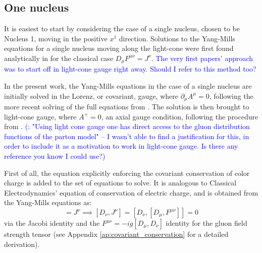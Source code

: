 \subsection{One nucleus}
It is easiest to start by considering the case of a single nucleus, chosen to be Nucleus 1, moving in the positive $x^1$ direction.
Solutions to the Yang-Mills equations for a single nucleus moving along the light-cone were first found analytically in \cite{McLerran:1993ka} for the classical case $D_{\mu}F^{\mu \nu} = J^\nu$.   \textcolor{blue}{The very first papers' approach was to start off in light-cone gauge right away. Should I refer to this method too?}

In the present work, the Yang-Mills equations in the case of a single nucleus are initially solved in the Lorenz, or covariant, gauge, where $\partial_\mu A^\mu=0$, following the more recent solving of the full equations from \cite[Section 2.2]{Blaizot:2004wu}. The solution is then brought to light-cone gauge, where $A^+=0$, an axial gauge condition, following the procedure from \cite[Section 3A]{Carrington:2022bnv}. \textcolor{blue}{(\cite{Kovner:1995ja}: "Using light cone gauge one has direct access to the gluon distribution functions of the parton model" -- I wasn't able to find a justification for this, in order to include it as a motivation to work in light-cone gauge. Is there any reference you know I could use?)} %

First of all, the equation explicitly enforcing the covariant conservation of color charge is added to the set of equations to solve. It is analogous to Classical Electrodynamics' equation of conservation of electric charge, and is obtained from the Yang-Mills equations as:
\begin{equation}
	[D_\mu, F^{\mu \nu}] = J^\nu \implies [D_\nu, J^\nu] = [D_\nu, [D_\mu, F^{\mu \nu}]] = 0
	\label{eq:covariant_conservation}
\end{equation}
via the Jacobi identity and the $F^{\mu \nu} = -ig [D_\mu, D_\nu]$ identity for the gluon field strength tensor (see Appendix \ref{ap:covariant_conservation} for a detailed derivation). %

